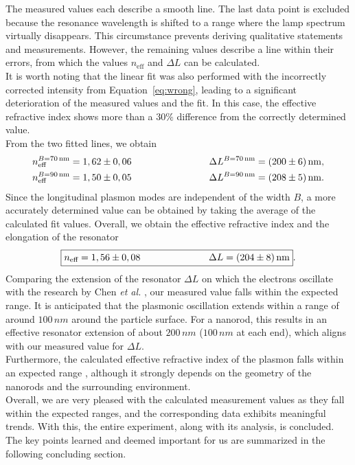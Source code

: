 The measured values each describe a smooth line. 
The last data point is excluded because the resonance wavelength is shifted to a range 
where the lamp spectrum virtually disappears. 
This circumstance prevents deriving qualitative statements and measurements. 
However, the remaining values describe a line within their errors, from which the values 
$n_{\text{eff}}$ and $\Delta{L}$ can be calculated. \\
It is worth noting that the linear fit was also performed with the incorrectly corrected 
intensity from Equation~\eqref{eq:wrong}, leading to a significant deterioration of the measured 
values and the fit. In this case, the effective refractive index shows more than a $30\%$ 
difference from the correctly determined value. \\
From the two fitted lines, we obtain
\begin{alignat*}{2}
    n_{\text{eff}}^{B=70\,\si{nm}} &= 1,62\pm 0,06 \hspace{2.5cm} &&\Delta{L}^{B=70\,\si{nm}} = (200 \pm 6)\,\si{nm}, \\
    n_{\text{eff}}^{B=90\,\si{nm}} &= 1,50\pm 0,05 \hspace{2.5cm} &&\Delta{L}^{B=90\,\si{nm}} = (208 \pm 5)\,\si{nm}.
\end{alignat*}
Since the longitudinal plasmon modes are independent of the width $B$, 
a more accurately determined value can be obtained by taking the average 
of the calculated fit values. 
Overall, we obtain the effective refractive index and the elongation of the resonator
\begin{equation}
    \fbox{$n_{\text{eff}} = 1,56\pm 0,08 \hspace{2.5cm} \Delta{L} = (204 \pm 8)\,\si{nm}$}.
\end{equation} 
Comparing the extension of the resonator $\Delta{L}$ on which the electrons oscillate with the 
research by Chen \textit{et al.} \cite{DelL}, our measured value falls within the expected range. 
It is anticipated that the plasmonic oscillation extends within a range of around $100\,\si{nm}$ around 
the particle surface. 
For a nanorod, this results in an effective resonator extension of about $200\,\si{nm}$ 
($100\,\si{nm}$ at each end), which aligns with our measured value for $\Delta{L}$. \\
Furthermore, the calculated effective refractive index of the plasmon falls within an expected 
range \cite{Anleitung,DelL}, although it strongly depends on the geometry of the nanorods
and the surrounding environment. \\
Overall, we are very pleased with the calculated measurement values as they fall within the expected ranges, 
and the corresponding data exhibits meaningful trends. 
With this, the entire experiment, along with its analysis, is concluded. 
The key points learned and deemed important for us are summarized in the following concluding section. \\







